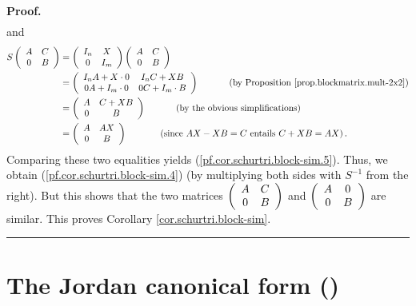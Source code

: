 \documentclass[numbers=enddot,12pt,final,onecolumn,notitlepage]{scrartcl}%
\numberwithin{exer}{subsection}
\theoremstyle{definition}
\newenvironment{proof}[1][Proof]{\noindent\textbf{#1.} }{\ \rule{0.5em}{0.5em}}
\begin{document}
\begin{proof}
\begin{align*}
\end{align*}
and%
\begin{align*}
S\left(
\begin{array}
[c]{cc}%
A & C\\
0 & B
\end{array}
\right)   &  =\left(
\begin{array}
[c]{cc}%
I_{n} & X\\
0 & I_{m}%
\end{array}
\right)  \left(
\begin{array}
[c]{cc}%
A & C\\
0 & B
\end{array}
\right) \\
&  =\left(
\begin{array}
[c]{cc}%
I_{n}A+X\cdot0 & I_{n}C+XB\\
0A+I_{m}\cdot0 & 0C+I_{m}\cdot B
\end{array}
\right)  \ \ \ \ \ \ \ \ \ \ \left(  \text{by Proposition
\ref{prop.blockmatrix.mult-2x2}}\right) \\
&  =\left(
\begin{array}
[c]{cc}%
A & C+XB\\
0 & B
\end{array}
\right)  \ \ \ \ \ \ \ \ \ \ \left(  \text{by the obvious simplifications}%
\right) \\
&  =\left(
\begin{array}
[c]{cc}%
A & AX\\
0 & B
\end{array}
\right)  \ \ \ \ \ \ \ \ \ \ \ \left(  \text{since }AX-XB=C\text{ entails
}C+XB=AX\right)  .
\end{align*}
Comparing these two equalities yields (\ref{pf.cor.schurtri.block-sim.5}).
Thus, we obtain (\ref{pf.cor.schurtri.block-sim.4}) (by multiplying both sides
with $S^{-1}$ from the right). But this shows that the two matrices $\left(
\begin{array}
[c]{cc}%
A & C\\
0 & B
\end{array}
\right)  $ and $\left(
\begin{array}
[c]{cc}%
A & 0\\
0 & B
\end{array}
\right)  $ are similar. This proves Corollary \ref{cor.schurtri.block-sim}.
\end{proof}

\section{The Jordan canonical form (\cite[Chapter 3]{HorJoh13})}
\end{document}

